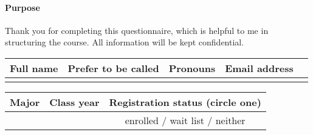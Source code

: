 \documentclass[10pt]{article}
\begin{document}

\paragraph*{Purpose} 
Thank you for completing this questionnaire, which is helpful to me in structuring the course.  All information will be kept confidential.

\begin{center}
\begin{tabular}{|c|c|c|c|c|}
	\hline
	Full name & Prefer to be called & Pronouns & Email address \\
	\hline
	\hspace{1.75in} & \hspace{1in} & \hspace{0.5in} & \hspace{2.15in} \\[2ex]
	\hline
\end{tabular}
\newline
\vspace*{0.1in}
\newline
\begin{tabular}{|c|c|c|}
	\hline
	Major & Class year & Registration status (circle one) \\
	\hline
	\hspace{3in} & \hspace{0.9in} & enrolled / wait list / neither \\ [2ex]
	\hline
\end{tabular}
\end{center}
\end{document}
